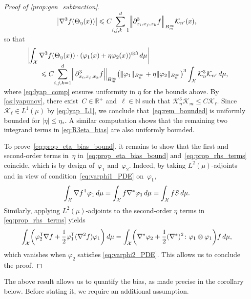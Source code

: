 \documentclass[11pt]{article}
\newcommand{\R}{\mathbb{R}}
\newcommand{\N}{\mathbb{N}}
\renewcommand{\leq}{\leqslant}
\renewcommand{\t}{\mathsf T}
\DeclarePairedDelimiter\abs{\lvert}{\rvert}
\DeclarePairedDelimiter\norm{\lVert}{\rVert}
\DeclarePairedDelimiter\paren{\lparen}{\rparen}
\theoremstyle{definition}
\begin{document}
\begin{proof}[Proof of \cref{prop:gen_subtraction}]
\begin{align}
    \notag
	\abs*{\nabla^3f\paren*{\Theta_\eta(x)}} \leq C\smash{\sum_{i,j,k=1}^d}\norm*{\partial_{x_i,x_j,x_k}^3 f}_{B_m^\infty}\mathcal{K}_{n'}(x),
\end{align}
so that 
\begin{align}
    \notag
	&\left|\int_\mathcal{X} \nabla^3f\paren*{\Theta_\eta(x)}\cdot (\varphi_1(x) + \eta\varphi_2(x))^{\otimes 3} \, d\mu\right| \\
	\label{eq:rem_bounded}
&\qquad \leq C\smash{\sum_{i,j,k=1}^d}\norm*{\partial_{x_i,x_j,x_k}^3 f}_{B_m^\infty}\paren*{\norm{\varphi_1}_{B_n^\infty} + \eta\norm{\varphi_2}_{B_n^\infty}}^3\int_\mathcal{X} \mathcal{K}_n^3\mathcal{K}_{n'} \, d\mu,
\end{align}
where \eqref{eq:lyap_comp} ensures uniformity in $\eta$ for the bounds above. By \cref{as:lyapunov}, there exist~$C\in \R^+$ and~$\ell\in\N$ such that $\mathcal{K}_n^3\mathcal{K}_m \leq C\mathcal{K}_\ell$. Since $\mathcal{K}_\ell \in L^1(\mu)$ by \eqref{eq:lyap_L1}, we conclude that~\eqref{eq:rem_bounded} is uniformly bounded for $|\eta|\leq \eta_*$. A similar computation shows that the remaining two integrand terms in \eqref{eq:R3eta_bias} are also uniformly bounded. 

To prove~\eqref{eq:prop_eta_bias_bound}, it remains to show that the first and second-order terms in~$\eta$ in~\eqref{eq:prop_eta_bias_bound} and~\eqref{eq:prop_rhs_terms} coincide, which is by design of~$\varphi_1$ and~$\varphi_2$. Indeed, by taking $L^2(\mu)$-adjoints and in view of condition~\eqref{eq:varphi1_PDE} on~$\varphi_1$,
\begin{equation}
    \notag
	\int_\mathcal{X} \nabla f^\t \varphi_1 \, d\mu = \int_\mathcal{X} f\nabla^* \varphi_1 \, d\mu = \int_\mathcal{X} f S \, d\mu.
\end{equation}
Similarly, applying $L^2(\mu)$-adjoints to the second-order $\eta$ terms in \eqref{eq:prop_rhs_terms} yields
\begin{align}
    \notag
	\int_\mathcal{X} \paren*{\varphi_2^\t \nabla f + \frac{1}{2}\varphi_1^\t (\nabla^2f) \varphi_1} \, d\mu = \int_\mathcal{X} \paren*{\nabla^*\varphi_2 + \frac{1}{2}(\nabla^*)^2 \colon \varphi_1\otimes \varphi_1}f \, d\mu,
	\label{eq:eta2_term}
\end{align}
which vanishes when $\varphi_2$ satisfies \eqref{eq:varphi2_PDE}. This allows us to conclude the proof.
\end{proof}

The above result allows us to quantify the bias, as made precise in the corollary below. Before stating it, we require an additional assumption.
\end{document}
